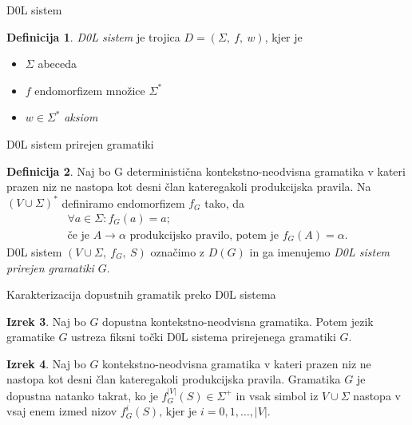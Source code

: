 \documentclass{beamer}
\theoremstyle{definition} %
\newtheorem{definicija}{Definicija}[section]
\newtheorem{izrek}[definicija]{Izrek}
\begin{document}
\begin{frame}{D0L sistem}
    \begin{definicija}
        \textit{D0L sistem} je trojica $ D = (\Sigma, \ f, \ w) $, kjer je
        \begin{itemize}
            \item<2-> $ \Sigma $ abeceda
            \item<3-> $ f $ endomorfizem množice $ \Sigma^* $
            \item<4-> $ w \in \Sigma^* $ \textit{aksiom}
        \end{itemize}
        \pause
    \end{definicija}
\end{frame}

\begin{frame}{D0L sistem prirejen gramatiki}
    \begin{definicija}
        Naj bo G deterministična kontekstno-neodvisna gramatika v kateri prazen niz ne nastopa kot desni član kateregakoli
        produkcijska pravila. Na $ (V \cup \Sigma)^* $ definiramo endomorfizem $ f_G $ tako, da 
        \begin{gather*}
            \forall a \in \Sigma \colon f_G(a) = a; \\
            \text{če je } A \rightarrow \alpha \text{ produkcijsko pravilo, potem je } f_G(A) = \alpha.
        \end{gather*}
        \pause
        D0L sistem $ (V \cup \Sigma, \ f_G, \ S) $ označimo z $ D(G) $ in ga imenujemo \textit{D0L sistem prirejen gramatiki $G$}.
    \end{definicija}
\end{frame}

\begin{frame}{Karakterizacija dopustnih gramatik preko D0L sistema}
    \begin{izrek}
        Naj bo $G$ dopustna kontekstno-neodvisna gramatika.
        Potem jezik gramatike $G$ ustreza fiksni točki D0L sistema prirejenega gramatiki $G$.
    \end{izrek}
    \pause
    \begin{izrek}
        Naj bo $G$ kontekstno-neodvisna gramatika v kateri prazen niz ne nastopa kot desni član kateregakoli
        produkcijska pravila. Gramatika $G$ je dopustna natanko takrat, ko je $ f_G^{|V|}(S) \in \Sigma^+ $
        in vsak simbol iz $ V \cup \Sigma $ nastopa v vsaj enem izmed nizov $ f_G^i(S) \text{, kjer je } i = 0, 1, \ldots, |V| $.
    \end{izrek}
\end{frame}
\end{document}
